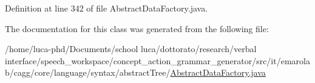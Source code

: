 Definition at line 342 of file Abstract\-Data\-Factory.\-java.



The documentation for this class was generated from the following file\-:\begin{DoxyCompactItemize}
\item 
/home/luca-\/phd/\-Documents/school luca/dottorato/research/verbal interface/speech\-\_\-workspace/concept\-\_\-action\-\_\-grammar\-\_\-generator/src/it/emarolab/cagg/core/language/syntax/abstract\-Tree/\hyperlink{AbstractDataFactory_8java}{Abstract\-Data\-Factory.\-java}\end{DoxyCompactItemize}
